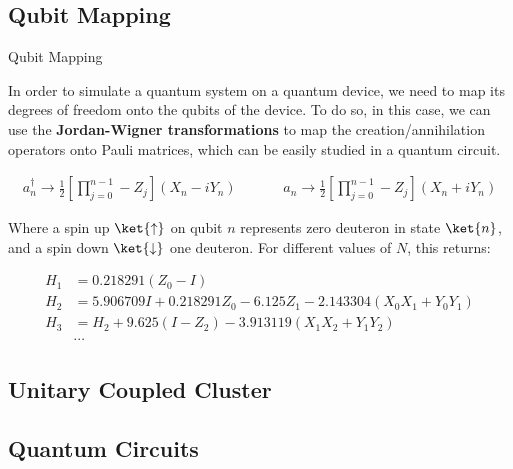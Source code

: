 \documentclass[9pt, handout, aspectratio=169]{beamer}		%
\begin{document}

	\subsection{Qubit Mapping}
	
	\begin{frame}{Qubit Mapping}
	
		In order to simulate a quantum system on a quantum device, we need to map its degrees of freedom onto the qubits of the device. To do so, in this case, we can use the \textbf{Jordan-Wigner transformations} to map the creation/annihilation operators onto Pauli matrices, which can be easily studied in a quantum circuit.
		
		\begin{align*}
			a^{\dagger}_{n} \rightarrow \frac{1}{2} \left[ \prod^{n-1}_{j=0} -Z_j \right] (X_n - i Y_n) 
			\hspace{40pt} 
			a_{n} \rightarrow \frac{1}{2} \left[ \prod^{n-1}_{j=0} -Z_j \right] (X_n + i Y_n)
		\end{align*}
		
		Where a spin up $\ket{\uparrow}$ on qubit $n$ represents zero deuteron in state $\ket{n}$, and a spin down $\ket{\downarrow}$ one deuteron. For different values of $N$, this returns:
		
		\begin{align*}
			H_1 &= 0.218291(Z_0 - I) \\
			H_2 &= 5.906709 I + 0.218291 Z_0 - 6.125 Z_1 - 2.143304(X_0 X_1 + Y_0 Y_1) \\
			H_3 &= H_2 + 9.625(I-Z_2) - 3.913119(X_1 X_2 + Y_1 Y_2) \\
			&\cdots
		\end{align*}
	
		\vspace{-20pt}
	
	\end{frame}
	

	\subsection{Unitary Coupled Cluster}
	

	\subsection{Quantum Circuits}
	
\end{document}
